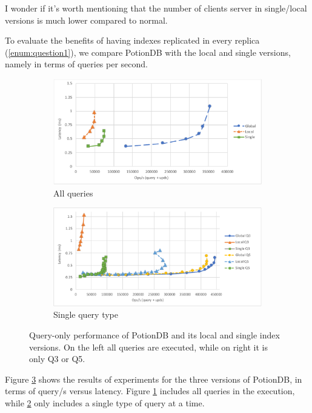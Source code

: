 \documentclass{vldb}
\newcommand{\grumbler}[2]{{\color{red}{\bf #1:} #2}}
\newcommand{\andre}[1]{\grumbler{andre}{#1}}
\begin{document}
\andre{I wonder if it's worth mentioning that the number of clients server in single/local versions is much lower compared to normal.}

To evaluate the benefits of having indexes replicated in every replica (\ref{enum:question1}), we compare PotionDB with the local and single versions, namely in terms of queries per second.

\begin{figure}
	\centering
	\begin{subfigure}{.5\linewidth}
		\centering
		\includegraphics[width=.95\linewidth]{global_local_single_cut}
		\caption{All queries}
		\label{fig:global_local_single}
	\end{subfigure}%
	\begin{subfigure}{.5\linewidth}
		\centering
		\includegraphics[width=.95\linewidth]{individual_query_cut}
		\caption{Single query type}
		\label{fig:q3q5}
	\end{subfigure}
	\caption{Query-only performance of PotionDB and its local and single index versions. On the left all queries are executed, while on right it is only Q3 or Q5.}
	\label{fig:query_only}
\end{figure}

Figure \ref{fig:query_only} shows the results of experiments for the three versions of PotionDB, in terms of query/s versus latency.
Figure \ref{fig:global_local_single} includes all queries in the execution, while \ref{fig:q3q5} only includes a single type of query at a time.
\end{document}
